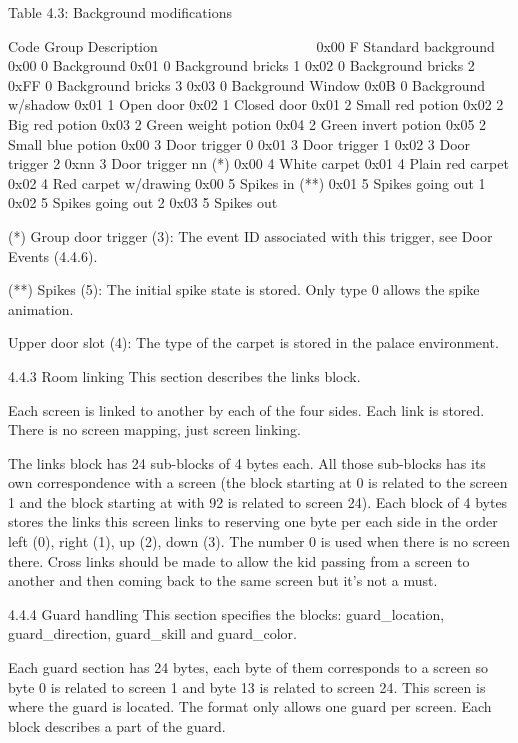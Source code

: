                    Table 4.3: Background modifications
                   ~~~~~~~~~~~~~~~~~~~~~~~~~~~~~~~~~~~

  Code Group Description
  ~~~~ ~~~~~ ~~~~~~~~~~~
  0x00 F     Standard background
  0x00 0     Background
  0x01 0     Background bricks 1
  0x02 0     Background bricks 2
  0xFF 0     Background bricks 3
  0x03 0     Background Window
  0x0B 0     Background w/shadow
  0x01 1     Open door
  0x02 1     Closed door
  0x01 2     Small red potion
  0x02 2     Big red potion
  0x03 2     Green weight potion
  0x04 2     Green invert potion
  0x05 2     Small blue potion
  0x00 3     Door trigger 0
  0x01 3     Door trigger 1
  0x02 3     Door trigger 2
  0xnn 3     Door trigger nn (*)
  0x00 4     White carpet
  0x01 4     Plain red carpet
  0x02 4     Red carpet w/drawing
  0x00 5     Spikes in (**)
  0x01 5     Spikes going out 1
  0x02 5     Spikes going out 2 
  0x03 5     Spikes out

 (*) Group door trigger (3):
 The event ID associated with this trigger, see Door Events (4.4.6).

 (**) Spikes (5):
 The initial spike state is stored. Only type 0 allows the spike animation.

 Upper door slot (4):
 The type of the carpet is stored in the palace environment.

4.4.3 Room linking
 This section describes the links block.

 Each screen is linked to another by each of the four sides. Each link
 is stored. There is no screen mapping, just screen linking.

 The links block has 24 sub-blocks of 4 bytes each. All those sub-blocks
 has its own correspondence with a screen (the block starting at 0 is
 related to the screen 1 and the block starting at with 92 is related to
 screen 24).
 Each block of 4 bytes stores the links this screen links to reserving one
 byte per each side in the order left (0), right (1), up (2), down (3).
 The number 0 is used when there is no screen there.
 Cross links should be made to allow the kid passing from a screen to
 another and then coming back to the same screen but it's not a must.

4.4.4 Guard handling
 This section specifies the blocks: guard_location, guard_direction,
 guard_skill and guard_color.

 Each guard section has 24 bytes, each byte of them corresponds to a screen
 so byte 0 is related to screen 1 and byte 13 is related to screen 24.
 This screen is where the guard is located. The format only allows one
 guard per screen. Each block describes a part of the guard.

